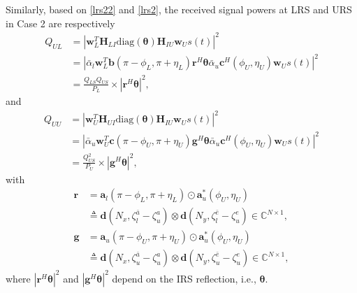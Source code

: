 \documentclass[10pt,final,doublecolumn]{IEEEtran}
\begin{document}
Similarly, based on \eqref{lrs22} and \eqref{lrs2}, the received signal powers at LRS and URS in Case 2 are respectively
\begin{align}\label{qul}
{Q}_{UL}&={|\mathbf{w}_{{L}}^T\mathbf{H}_{LI}\text{diag}(\boldsymbol{\theta})\mathbf{H}_{IU}
\mathbf{w}_{{U}}s(t)|^2}\nonumber\\
&={|\bar{\alpha}_l\mathbf{w}_{{L}}^T\mathbf{b}(\pi-{\phi}_{{L}},\pi+{\eta}_{{L}}){\mathbf{r}}^H
\boldsymbol{\theta}\bar{\alpha}_u\mathbf{c}^H
({\phi}_{{U}},{\eta}_{{U}})
\mathbf{w}_{{U}}s(t)|^2}\nonumber\\
&={\frac{Q_{LS}Q_{US}}{P_L}\times|{\mathbf{r}}^H
\boldsymbol{\theta}|^2},
\end{align}
and
\begin{align}\label{quu}
{Q}_{UU}&={|\mathbf{w}_{{U}}^T\mathbf{H}_{UI}
\text{diag}(\boldsymbol{\theta})\mathbf{H}_{IU}\mathbf{w}_{{U}}s(t)|^2}\nonumber\\
&={|\bar{\alpha}_u\mathbf{w}_{{U}}^T\mathbf{c}(\pi-{\phi}_{{U}},\pi+{\eta}_{{U}}){\mathbf{g}}^H
\boldsymbol{\theta}\bar{\alpha}_u
\mathbf{c}^H({\phi}_{{U}},{\eta}_{{U}})\mathbf{w}_{{U}}s(t)|^2}\nonumber\\
&={\frac{Q_{US}^2}{P_U}\times|{\mathbf{g}}^H
\boldsymbol{\theta}|^2},
\end{align}
with
\begin{align}
{\mathbf{r}}&=\mathbf{a}_l(\pi-{\phi}_{{L}},\pi+{\eta}_{{L}})\odot \mathbf{a}_u^*({\phi}_{{U}},{\eta}_{{U}})\nonumber\\
&\triangleq \mathbf{d}(N_x,\zeta_l^{\bar{a}}-\zeta_u^{a}) \otimes \mathbf{d}(N_y,\zeta_l^{\bar{e}}-\zeta_u^{e})\in \mathbb{C}^{N\times 1},\label{ro}\\
{\mathbf{g}}&=\mathbf{a}_u(\pi-{\phi}_{{U}},\pi+{\eta}_{{U}})\odot \mathbf{a}_u^*({\phi}_{{U}},{\eta}_{{U}})\nonumber\\
&\triangleq \mathbf{d}(N_x,\zeta_u^{\bar{a}}-\zeta_u^{a}) \otimes \mathbf{d}(N_y,\zeta_u^{\bar{e}}-\zeta_u^{e})\in \mathbb{C}^{N\times 1},\label{go}
\end{align}
where $|{\mathbf{r}}^H \boldsymbol{\theta}|^2$ and $|{\mathbf{g}}^H \boldsymbol{\theta}|^2$ depend on the IRS reflection, i.e., $\boldsymbol{\theta}$.
\end{document}
